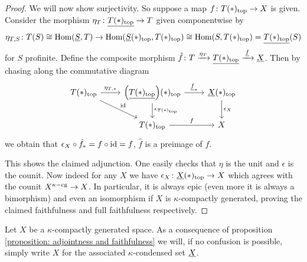 \begin{proof}
	We will now show surjectivity. So suppose a map $f\colon {T(\ast)_\mathrm{top}}\to X$ is given. Consider the morphism $\eta_T\colon \underline{{T(\ast)_\mathrm{top}}} \to T$ given componentwise by
		$$\eta_{T, S}\colon T(S)\cong {\operatorname{Hom}}(\underline{S}, T)\to {\operatorname{Hom}}({\underline{S}(\ast)_\mathrm{top}}, {T(\ast)_\mathrm{top}})\cong {\operatorname{Hom}}(S, {T(\ast)_\mathrm{top}})=\underline{{T(\ast)_\mathrm{top}}}(S)$$
	for $S$ profinite. Define the composite morphism $\hat f\colon T\xrightarrow{\eta_T} \underline{{T(\ast)_\mathrm{top}}}\xrightarrow{\;\underline{f}\;} \underline{X}$. Then by chasing along the commutative diagram
	$$\begin{tikzcd}
		\topologizedUnderlying{T} \ar[r, "\eta_{T,\ast}"] \ar[dr, "\id"] &\topologizedUnderlying{\mleft(\associated{\topologizedUnderlying{T}}\mright)} \ar[r, "\associated{f}_\ast"] \ar[d, "\epsilon_{\topologizedUnderlying{T}}"] &\topologizedUnderlying{\associated{X}} \ar[d, "\epsilon_X"]\\
		&\topologizedUnderlying{T} \ar[r, "f"] &X
	\end{tikzcd}$$
	we obtain that $\epsilon_X\circ \hat{f}_\ast = f\circ \mathrm{id} = f$, \ie $\hat{f}$ is a preimage of $f$.
	
	This shows the claimed adjunction. One easily checks that $\eta$ is the unit and $\epsilon$ is the counit. Now indeed for any $X$ we have $\epsilon_X\colon {\underline{X}(\ast)_\mathrm{top}}\to X$ which agrees with the counit $X^{\kappa\mathrm{-cg}}\to X$. In particular, it is always epic (even more it is always a bimorphism) and even an isomorphism if $X$ is $\kappa$-compactly generated, proving the claimed faithfulness and full faithfulness respectively.
\end{proof}

\begin{notation}
	Let $X$ be a $\kappa$-compactly generated space. As a consequence of proposition \ref{proposition: adjointness and faithfulness} we will, if no confusion is possible, simply write $X$ for the associated $\kappa$-condensed set $\underline{X}$.
\end{notation}

